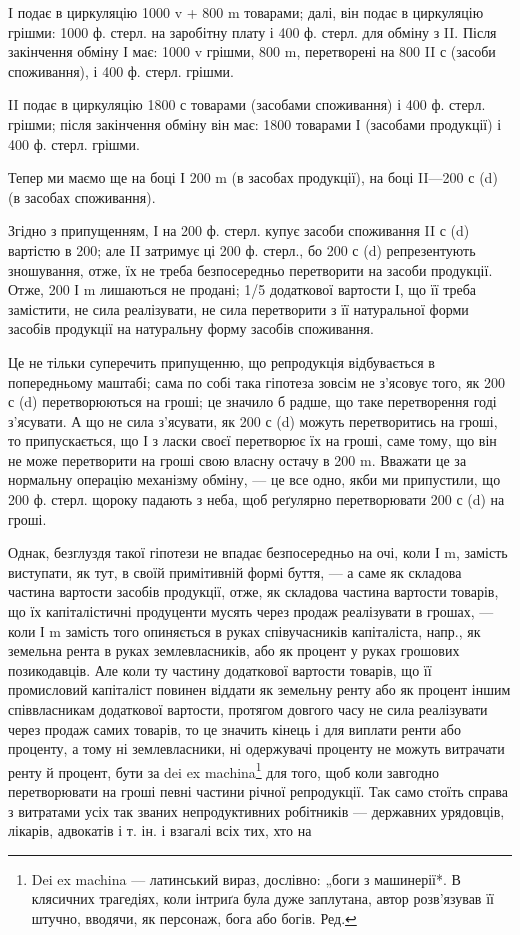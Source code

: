 I подає в циркуляцію 1000 v + 800 m товарами; далі, він подає
в циркуляцію грішми: 1000 ф. стерл. на заробітну плату і 400 ф. стерл.
для обміну з II. Після закінчення обміну І має: 1000 v грішми, 800 m,
перетворені на 800 II с (засоби споживання), і 400 ф. стерл. грішми.

II подає в циркуляцію 1800 с товарами (засобами споживання) і
400 ф. стерл. грішми; після закінчення обміну він має: 1800 товарами І
(засобами продукції) і 400 ф. стерл. грішми.

Тепер ми маємо ще на боці І 200 m (в засобах продукції), на боці
II—200 с (d) (в засобах споживання).

Згідно з припущенням, І на 200 ф. стерл. купує засоби споживання
II с (d) вартістю в 200; але II затримує ці 200 ф. стерл., бо 200 с (d)
репрезентують зношування, отже, їх не треба безпосередньо перетворити
на засоби продукції. Отже, 200 І m лишаються не продані;
1/5 додаткової вартости І, що її треба замістити, не сила реалізувати, не
сила перетворити з її натуральної форми засобів продукції на натуральну
форму засобів споживання.

Це не тільки суперечить припущенню, що репродукція відбувається
в попередньому маштабі; сама по собі така гіпотеза зовсім не з’ясовує
того, як 200 с (d) перетворюються на гроші; це значило б радше, що
таке перетворення годі з’ясувати. А що не сила з’ясувати, як 200 с (d)
можуть перетворитись на гроші, то припускається, що І з ласки своєї
перетворює їх на гроші, саме тому, що він не може перетворити на гроші
свою власну остачу в 200 m. Вважати це за нормальну операцію механізму
обміну, — це все одно, якби ми припустили, що 200 ф. стерл.
щороку падають з неба, щоб реґулярно перетворювати 200 с (d) на гроші.

Однак, безглуздя такої гіпотези не впадає безпосередньо на очі, коли І m,
замість виступати, як тут, в своїй примітивній формі буття, — а саме як
складова частина вартости засобів продукції, отже, як складова частина
вартости товарів, що їх капіталістичні продуценти мусять через продаж
реалізувати в грошах, — коли І m замість того опиняється в руках співучасників
капіталіста, напр., як земельна рента в руках землевласників,
або як процент у руках грошових позикодавців. Але коли ту частину додаткової
вартости товарів, що її промисловий капіталіст повинен віддати
як земельну ренту або як процент іншим співвласникам додаткової вартости,
протягом довгого часу не сила реалізувати через продаж самих
товарів, то це значить кінець і для виплати ренти або проценту, а тому
ні землевласники, ні одержувачі проценту не можуть витрачати ренту й
процент, бути за dei ex machina\footnote*{
Dei ex machina — латинський вираз, дослівно: „боги з машинерії*. В клясичних
трагедіях, коли інтриґа була дуже заплутана, автор розв’язував її штучно,
вводячи, як персонаж, бога або богів. Ред.
} для того, щоб коли завгодно перетворювати
на гроші певні частини річної репродукції. Так само стоїть
справа з витратами усіх так званих непродуктивних робітників — державних
урядовців, лікарів, адвокатів і т. ін. і взагалі всіх тих, хто на